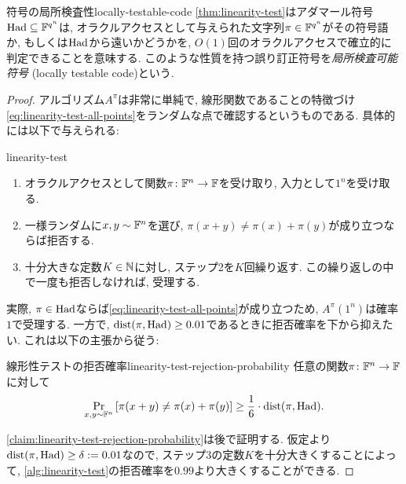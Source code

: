 \begin{remark}{符号の局所検査性}{locally-testable-code}
  \cref{thm:linearity-test}はアダマール符号$\mathrm{Had}\subseteq\mathbb{F}^{q^n}$は, オラクルアクセスとして与えられた文字列$\pi\in\mathbb{F}^{q^n}$がその符号語か, もしくは$\mathrm{Had}$から遠いかどうかを, $O(1)$回のオラクルアクセスで確立的に判定できることを意味する.
  このような性質を持つ誤り訂正符号を\emph{局所検査可能符号} (locally testable code)という.
\end{remark}
\begin{proof}
  アルゴリズム$A^\pi$は非常に単純で, 線形関数であることの特徴づけ\cref{eq:linearity-test-all-points}をランダムな点で確認するというものである.
  具体的には以下で与えられる:
  \begin{algo}{}{linearity-test}
    \begin{enumerate}
      \item オラクルアクセスとして関数$\pi\colon \mathbb{F}^n\to\mathbb{F}$を受け取り, 入力として$1^n$を受け取る.
      \item 一様ランダムに$x,y\sim\mathbb{F}^n$を選び, $\pi(x+y)\ne \pi(x)+\pi(y)$が成り立つならば拒否する.
      \item 十分大きな定数$K\in\mathbb{N}$に対し, ステップ2を$K$回繰り返す. この繰り返しの中で一度も拒否しなければ, 受理する.
    \end{enumerate}
  \end{algo}

  実際, $\pi\in\mathrm{Had}$ならば\cref{eq:linearity-test-all-points}が成り立つため, $A^\pi(1^n)$は確率$1$で受理する.
  一方で, $\mathrm{dist}(\pi,\mathrm{Had})\ge 0.01$であるときに拒否確率を下から抑えたい.
  これは以下の主張から従う:

  \begin{claim}{線形性テストの拒否確率}{linearity-test-rejection-probability}
    任意の関数$\pi\colon \mathbb{F}^n\to\mathbb{F}$に対して
    \begin{align*}
      \Pr_{x,y\sim\mathbb{F}^n}\qty[ \pi(x+y) \ne \pi(x)+\pi(y) ] \ge \frac{1}{6}\cdot \mathrm{dist}(\pi,\mathrm{Had}).
    \end{align*}  
  \end{claim}

  \cref{claim:linearity-test-rejection-probability}は後で証明する.
  仮定より$\mathrm{dist}(\pi,\mathrm{Had})\ge \delta:=0.01$なので,
  ステップ3の定数$K$を十分大きくすることによって, \cref{alg:linearity-test}の拒否確率を$0.99$より大きくすることができる.
  \end{proof}

